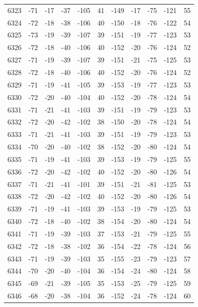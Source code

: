 \begin{table}[H]
\begin{tabular}{lllllllllll}
6323 & -71 & -17 & -37 & -105 & 41 & -149 & -17 & -75 & -121 & 55 \\
6324 & -72 & -18 & -38 & -106 & 40 & -150 & -18 & -76 & -122 & 54 \\
6325 & -73 & -19 & -39 & -107 & 39 & -151 & -19 & -77 & -123 & 53 \\
6326 & -72 & -18 & -40 & -106 & 40 & -152 & -20 & -76 & -124 & 52 \\
6327 & -71 & -19 & -39 & -107 & 39 & -151 & -21 & -75 & -125 & 53 \\
6328 & -72 & -18 & -40 & -106 & 40 & -152 & -20 & -76 & -124 & 52 \\
6329 & -71 & -19 & -41 & -105 & 39 & -153 & -19 & -77 & -123 & 53 \\
6330 & -72 & -20 & -40 & -104 & 40 & -152 & -20 & -78 & -124 & 54 \\
6331 & -71 & -21 & -41 & -103 & 39 & -151 & -19 & -79 & -123 & 53 \\
6332 & -72 & -20 & -42 & -102 & 38 & -150 & -20 & -78 & -124 & 54 \\
6333 & -71 & -21 & -41 & -103 & 39 & -151 & -19 & -79 & -123 & 53 \\
6334 & -70 & -20 & -40 & -102 & 38 & -152 & -20 & -80 & -124 & 54 \\
6335 & -71 & -19 & -41 & -103 & 39 & -153 & -19 & -79 & -125 & 55 \\
6336 & -72 & -20 & -42 & -102 & 40 & -152 & -20 & -80 & -126 & 54 \\
6337 & -71 & -21 & -41 & -101 & 39 & -151 & -21 & -81 & -125 & 53 \\
6338 & -72 & -20 & -42 & -102 & 40 & -152 & -20 & -80 & -126 & 54 \\
6339 & -71 & -19 & -41 & -103 & 39 & -153 & -19 & -79 & -125 & 53 \\
6340 & -72 & -18 & -40 & -102 & 38 & -154 & -20 & -80 & -124 & 54 \\
6341 & -71 & -19 & -39 & -103 & 37 & -153 & -21 & -79 & -125 & 55 \\
6342 & -72 & -18 & -38 & -102 & 36 & -154 & -22 & -78 & -124 & 56 \\
6343 & -71 & -19 & -39 & -103 & 35 & -155 & -23 & -79 & -123 & 57 \\
6344 & -70 & -20 & -40 & -104 & 36 & -154 & -24 & -80 & -124 & 58 \\
6345 & -69 & -21 & -39 & -105 & 35 & -153 & -25 & -79 & -125 & 59 \\
6346 & -68 & -20 & -38 & -104 & 36 & -152 & -24 & -78 & -124 & 60 \\

\end{tabular}
\end{table}
